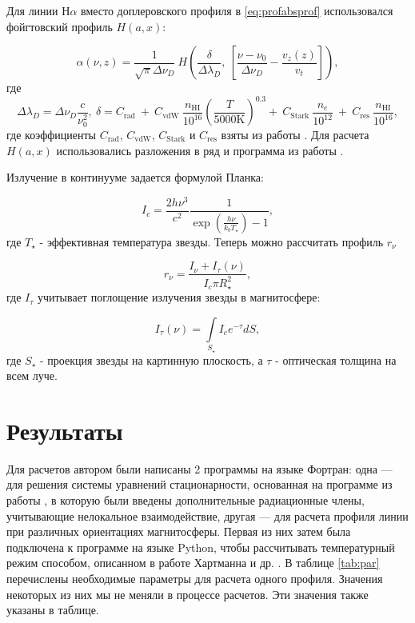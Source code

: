 \documentclass[12pt]{article}
\begin{document}
Для линии Н$\alpha$ вместо доплеровского профиля в \eqref{eq:profabsprof} использовался фойгтовский профиль $H(a, x)$:

\begin{equation} \label{eq:profabsfoigt}
\alpha(\nu, z) = \frac{1}{\sqrt{\pi} \Delta\nu_D}\ H\left(\frac{\delta}{\Delta\lambda_D},\ \left[ \frac{\nu - \nu_0}{\Delta\nu_D} - \frac{v_z(z)}{v_t}\right]\right),
\end{equation}
где 
\begin{equation} \label{eq:foigtcoef}
\Delta\lambda_D = \Delta\nu_D\frac{c}{\nu_0^2},\ \delta = C_{\text{rad}}\ + \ 
 C_{\text{vdW}}\ \frac{n_{\text{HI}}}{10^{16}}\left(\frac{T}{5000 \text{K}}\right)^{0.3} +\ 
 C_{\text{Stark}}\ \frac{n_e}{10^{12}}\ + \ C_{\text{res}}\ \frac{n_\text{HI}}{10^{16}},
\end{equation}
где коэффициенты $C_\text{rad}$, $C_\text{vdW}$, $C_\text{Stark}$ и $C_\text{res}$ взяты из работы \cite{luttermoser92}. Для расчета $H(a, x)$ использовались разложения в ряд и программа из работы \cite{humlicek82}.

Излучение в континууме задается формулой Планка:

\begin{equation} \label{eq:profcont}
I_c = \frac{2h\nu^3}{c^2}\frac{1}{\exp\left(\frac{h\nu}{k_bT_\star}\right)-1},
\end{equation}
где $T_\star$ - эффективная температура звезды. Теперь можно рассчитать профиль $r_{\nu}$

\begin{equation} \label{eq:profnorm}
r_{\nu} = \frac{I_\nu + I_{\tau}(\nu)}{I_c \pi R_\star^2},
\end{equation}
где $I_{\tau}$ учитывает поглощение излучения звезды в магнитосфере:

\begin{equation} \label{eq:absorbprof}
I_{\tau}(\nu) = \int \limits_{S_\star} I_c e^{-\tau} dS,
\end{equation}
где $S_\star$ - проекция звезды на картинную плоскость, а $\tau$ - оптическая толщина на всем луче.

\section{Результаты}
Для расчетов автором были написаны 2 программы на языке Фортран: одна --- для решения системы уравнений стационарности, основанная на программе из работы \cite{katysheva80}, в которую были введены дополнительные радиационные члены, учитывающие нелокальное взаимодействие, другая --- для расчета профиля линии при различных ориентациях магнитосферы. Первая из них затем была подключена к программе на языке Python, чтобы рассчитывать температурный режим способом, описанном в работе Хартманна и др. \cite{hartmann94}. В таблице \ref{tab:par} перечислены необходимые параметры для расчета одного профиля. Значения некоторых из них мы не меняли в процессе расчетов. Эти значения также указаны в таблице.
\end{document}
